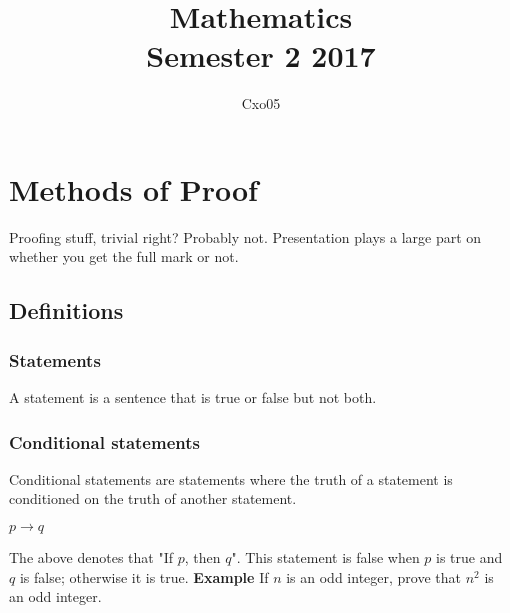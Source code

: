 \documentclass[10pt,a4paper]{article}
\begin{document}
\title{
Mathematics \\
\large Semester 2 2017
}
\author{Cxo05}

\maketitle

\section{Methods of Proof}
Proofing stuff, trivial right? Probably not. Presentation plays a large part on whether you get the full mark or not.

\subsection{Definitions}
\subsubsection{Statements}
A statement is a sentence that is true or false but not both.
\subsubsection{Conditional statements}
Conditional statements are statements where the truth of a statement is conditioned on the truth of another statement.
\begin{center}
$p \rightarrow q$
\end{center}
The above denotes that "If $p$, then $q$". This statement is false when $p$ is true and $q$ is false; otherwise it is true.
\newline\newline
\textbf{Example} 
If $n$ is an odd integer, prove that $n^2$ is an odd integer.
\newline
\end{document}
